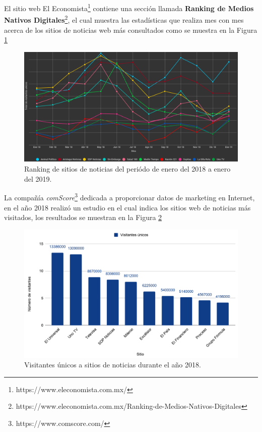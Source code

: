 El sitio web El Economista\footnote{https://www.eleconomista.com.mx/} contiene una sección llamada \textbf{Ranking de Medios Nativos Digitales}\footnote{https://www.eleconomista.com.mx/Ranking-de-Medios-Nativos-Digitales}, el cual muestra las estadísticas que realiza mes con mes acerca de los sitios de noticias web más consultados como se muestra en la Figura \ref{fig:rank}\\

\begin{figure}[H]
  \centering
  \includegraphics[scale=.28]{imagenes/Capitulo5/ranking.png}
  \caption{Ranking de sitios de noticias del periódo de enero del 2018 a enero del 2019.}
  \label{fig:rank}
\end{figure}

La compañía \textit{comScore}\footnote{https://www.comscore.com/} dedicada a proporcionar datos de marketing en Internet, en el año 2018 realizó un estudio en el cual indica los sitios web de noticias más visitados, los resultados se muestran en la Figura \ref{fig:comScore}

\begin{figure}[H]
  \centering
  \includegraphics[scale=.28]{imagenes/Capitulo5/visitantesPorSitioComScore.png}
  \caption{Visitantes únicos a sitios de noticias durante el año 2018.}
  \label{fig:comScore}
\end{figure}

